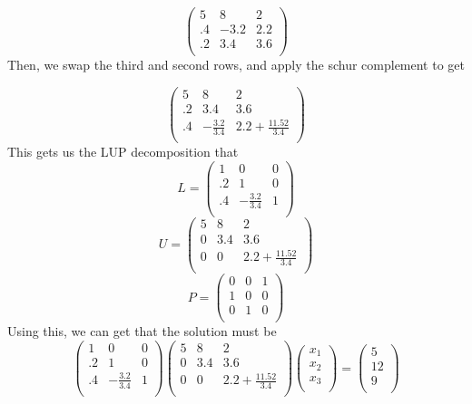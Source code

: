 \documentclass{article}
\begin{document}
 \[
 \left(\begin{array}{ccc}
 5&8&2\\
 .4&-3.2&2.2\\
 .2&3.4&3.6\\
 \end{array}\right)
 \]
 Then, we swap the third and second rows, and apply the schur complement to get
 
 \[
 \left(\begin{array}{ccc}
 5&8&2\\
 .2&3.4&3.6\\
 .4&-\frac{3.2}{3.4}&2.2 +\frac{11.52}{3.4}\\
 \end{array}\right) 
 \]
This gets us the LUP decomposition that 
\[
L =  \left(\begin{array}{ccc}
 1&0&0\\
 .2&1&0\\
 .4&-\frac{3.2}{3.4}&1\\
 \end{array}\right) 
\]
\[
U =  \left(\begin{array}{ccc}
 5&8&2\\
 0&3.4&3.6\\
 0&0&2.2 +\frac{11.52}{3.4}\\
 \end{array}\right) 
\]
\[
P =  \left(\begin{array}{ccc}
 0&0&1\\
 1&0&0\\
 0&1&0\\
 \end{array}\right) 
\]
Using this, we can get that the solution must be
\[
\left(\begin{array}{ccc}
 1&0&0\\
 .2&1&0\\
 .4&-\frac{3.2}{3.4}&1\\
 \end{array}\right) 
 \left(\begin{array}{ccc}
 5&8&2\\
 0&3.4&3.6\\
 0&0&2.2 +\frac{11.52}{3.4}\\
 \end{array}\right) 
  \left(\begin{array}{c}
 x_1\\
 x_2\\
 x_3\\
 \end{array}\right) 
=
  \left(\begin{array}{c}
 5\\
 12\\
 9\\
 \end{array}\right) 
\]
\end{document}
